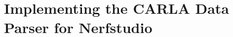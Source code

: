 \begin{comment}
The following algorithm outlines the steps for capturing synthetic data using the CARLA simulator. The code is written in Python and utilizes the CARLA library.

    
\begin{algorithmic}[1]
\Function{run\_carla\_session}{experiment\_settings}
    \State \textbf{create a directory} for the experiment and save experiment settings to a file
    \State \textbf{create a SLURM script} for the experiment
    \State \textbf{spawn an ego vehicle} and set up the traffic manager
    \State \textbf{create cameras} based on the specified camera rigs and rig file
    \State \textbf{create a TransformFile} to store the image and camera pose data
    \While{\textbf{stop criteria has not been met}}
        \State \textbf{tick the CARLA world}
        \State \textbf{get images} from all mounted cameras and stack them horizontally
        \State \textbf{show the image}
        \State \textbf{store the image and camera pose data} every n-th tick
        \State \textbf{update the distance traveled} using euclidean distance
    \EndWhile
    \State \textbf{export the TransformFile} and destroy the actors
\EndFunction
\end{algorithmic}

\end{comment}











\section{Implementing the CARLA Data Parser for Nerfstudio} \label{sec:carla-to-nerfstudio}
\begin{comment}
Premise: Have collected data from CARLA.
Question: How do I get it from CARLA to Nerfstudio in a usable format?

\begin{itemize}
    \item Use the CARLA-simulator to find out which camera and vehicle settings work the best for capturing data for NeRFs.
    \item In order to do that I need to collect data from CARLA and convert it into a format that's usable by Nerfstudio.
\end{itemize}
\end{comment}

